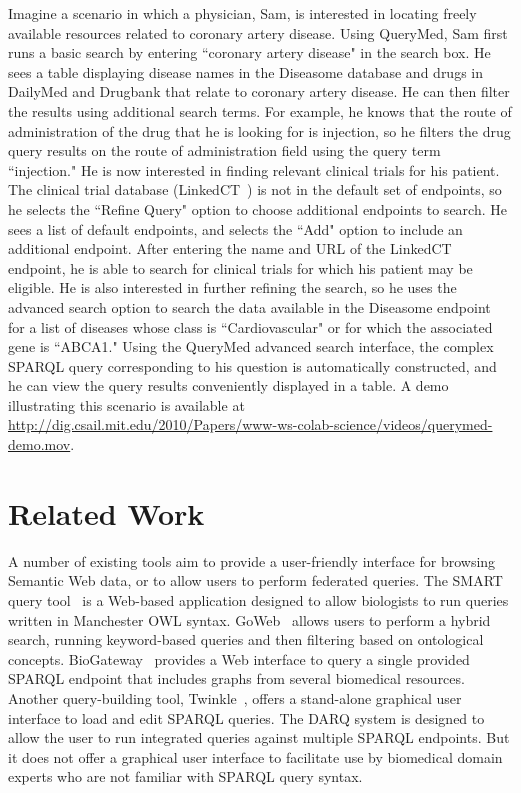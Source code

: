 \documentclass{acm_proc_article-sp}
\begin{document}
Imagine a scenario in which a physician, Sam, is interested in locating freely available resources related to coronary artery disease.  Using QueryMed, Sam first runs a basic search by entering ``coronary artery disease" in the search box. He sees a table displaying disease names in the Diseasome database and drugs in DailyMed and Drugbank that relate to coronary artery disease.  He can then filter the results using additional search terms.  For example, he knows that the route of administration of the drug that he is looking for is injection, so he filters the drug query results on the route of administration field using the query term ``injection."  He is now interested in finding relevant clinical trials for his patient.  The clinical trial database (LinkedCT~\cite{LinkedCT}) is not in the default set of endpoints, so he selects the ``Refine Query" option to choose additional endpoints to search.  He sees a list of default endpoints, and selects the ``Add" option to include an additional endpoint.  After entering the name and URL of the LinkedCT endpoint, he is able to search for clinical trials for which his patient may be eligible.  He is also interested in further refining the search, so he uses the advanced search option to search the data available in the Diseasome endpoint for a list of diseases whose class is ``Cardiovascular" or for which the associated gene is ``ABCA1."  Using the QueryMed advanced search interface, the complex SPARQL query corresponding to his question is automatically constructed, and he can view the query results conveniently displayed in a table. A demo illustrating this scenario is available at \url{http://dig.csail.mit.edu/2010/Papers/www-ws-colab-science/videos/querymed-demo.mov}.

\section{Related Work}
\label{related}

A number of existing tools aim to provide a user-friendly interface for browsing Semantic Web data, or to allow users to perform federated queries. The SMART query tool~\cite{Battista} is a Web-based application designed to allow biologists to run queries written in Manchester OWL syntax. GoWeb~\cite{Dietze} allows users to perform a hybrid search, running keyword-based queries and then filtering based on ontological concepts.  BioGateway~\cite{Antezana} provides a Web interface to query a single provided SPARQL endpoint that includes graphs from several biomedical resources.  Another query-building tool, Twinkle~\cite{Dodds}, offers a stand-alone graphical user interface to load and edit SPARQL queries. The DARQ  system \cite{Quilitz} is designed to allow the user to run integrated queries against multiple SPARQL endpoints. But it does not offer a graphical user interface to facilitate use by biomedical domain experts who are not familiar with SPARQL query syntax.
\end{document}
